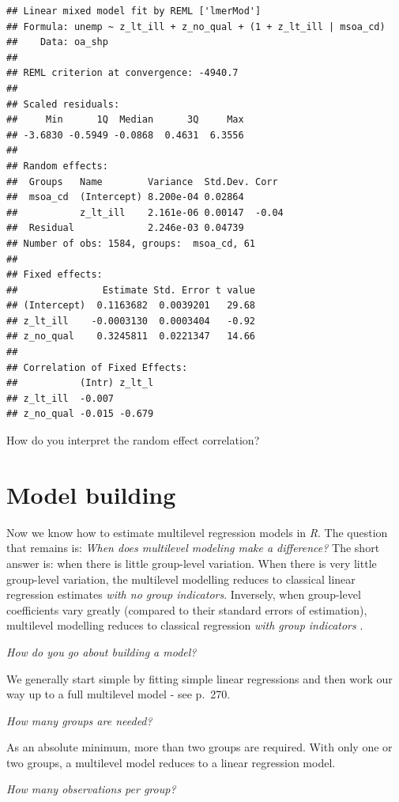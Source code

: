 \documentclass[]{book}
\begin{document}
\begin{verbatim}
## Linear mixed model fit by REML ['lmerMod']
## Formula: unemp ~ z_lt_ill + z_no_qual + (1 + z_lt_ill | msoa_cd)
##    Data: oa_shp
## 
## REML criterion at convergence: -4940.7
## 
## Scaled residuals: 
##     Min      1Q  Median      3Q     Max 
## -3.6830 -0.5949 -0.0868  0.4631  6.3556 
## 
## Random effects:
##  Groups   Name        Variance  Std.Dev. Corr 
##  msoa_cd  (Intercept) 8.200e-04 0.02864       
##           z_lt_ill    2.161e-06 0.00147  -0.04
##  Residual             2.246e-03 0.04739       
## Number of obs: 1584, groups:  msoa_cd, 61
## 
## Fixed effects:
##               Estimate Std. Error t value
## (Intercept)  0.1163682  0.0039201   29.68
## z_lt_ill    -0.0003130  0.0003404   -0.92
## z_no_qual    0.3245811  0.0221347   14.66
## 
## Correlation of Fixed Effects:
##           (Intr) z_lt_l
## z_lt_ill  -0.007       
## z_no_qual -0.015 -0.679
\end{verbatim}

How do you interpret the random effect correlation?

\section{Model building}\label{model-building}

Now we know how to estimate multilevel regression models in \emph{R}.
The question that remains is: \emph{When does multilevel modeling make a
difference?} The short answer is: when there is little group-level
variation. When there is very little group-level variation, the
multilevel modelling reduces to classical linear regression estimates
\emph{with no group indicators}. Inversely, when group-level
coefficients vary greatly (compared to their standard errors of
estimation), multilevel modelling reduces to classical regression
\emph{with group indicators} \citet{Gelman_Hill_2006_book}.

\emph{How do you go about building a model?}

We generally start simple by fitting simple linear regressions and then
work our way up to a full multilevel model - see
\citet{Gelman_Hill_2006_book} p.~270.

\emph{How many groups are needed?}

As an absolute minimum, more than two groups are required. With only one
or two groups, a multilevel model reduces to a linear regression model.

\emph{How many observations per group?}
\end{document}
